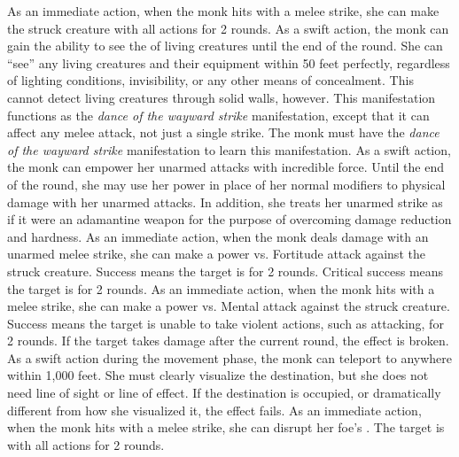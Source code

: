         As an immediate action, when the monk hits with a melee strike, she can make the struck creature \impaired with all actions for 2 rounds.
        As a swift action, the monk can gain the ability to see the \ki of living creatures until the end of the round.
        She can ``see'' any living creatures and their equipment within 50 feet perfectly, regardless of lighting conditions, invisibility, or any other means of concealment.
        This cannot detect living creatures through solid walls, however.
        This \ki manifestation functions as the \textit{dance of the wayward strike} manifestation, except that it can affect any melee attack, not just a single strike.
        The monk must have the \textit{dance of the wayward strike} \ki manifestation to learn this manifestation.
        As a swift action, the monk can empower her unarmed attacks with incredible force.
        Until the end of the round, she may use her \ki power in place of her normal modifiers to physical damage with her unarmed attacks.
        In addition, she treats her unarmed strike as if it were an adamantine weapon for the purpose of overcoming damage reduction and hardness.
        As an immediate action, when the monk deals damage with an unarmed melee strike, she can make a \Ki power vs. Fortitude attack against the struck creature.
        Success means the target is \staggered for 2 rounds.
        Critical success means the target is \stunned for 2 rounds.
        \norepeatnotes
        As an immediate action, when the monk hits with a melee strike, she can make a \Ki power vs. Mental attack against the struck creature.
        Success means the target is unable to take violent actions, such as attacking, for 2 rounds.
        If the target takes damage after the current round, the effect is broken.
        As a swift action during the movement phase, the monk can teleport to anywhere within 1,000 feet.
        She must clearly visualize the destination, but she does not need line of sight or line of effect.
        If the destination is occupied, or dramatically different from how she visualized it, the effect fails.
        As an immediate action, when the monk hits with a melee strike, she can disrupt her foe's \ki.
        The target is \severelyimpaired with all actions for 2 rounds.

